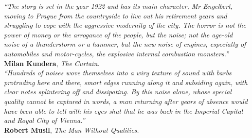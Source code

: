 \documentclass[final,twoside,11pt]{book}
\makeatletter
\numberwithin{equation}{section}
\numberwithin{figure}{chapter}
\numberwithin{table}{chapter}
\def\cleardoublepage{\clearpage\if@twoside \ifodd\c@page\else
  \hbox{}
  \thispagestyle{empty}
  \newpage
  \if@twocolumn\hbox{}\newpage\fi\fi\fi}
\makeatother
\begin{document}
\begin{flushright}
\begin{minipage}[t]{0.75\textwidth}

\linespread{0.97}\selectfont
{\itshape\small``The story is set in the year 1922 and has its main character, Mr Engelbert, moving to Prague from the countryside to live out his retirement years and struggling to cope with the aggressive modernity of the city. The horror is not the power of money or the arrogance of the people, but the noise; not the age-old noise of a thunderstorm or a hammer, but the new noise of engines, especially of automobiles and motor-cycles, the explosive internal combustion monsters.''}\\[-3mm]

{\cabincondensed\small\hfill \textbf{Milan Kundera}, \emph{The Curtain.}}\\[10mm]

\linespread{0.97}\selectfont
{\itshape\small``Hundreds of noises wove themselves into a wiry texture of sound with barbs protruding here and there, smart edges running along it and subsiding again, with clear notes splintering off and dissipating. By this noise alone, whose special quality cannot be captured in words, a man returning after years of absence would have been able to tell with his eyes shut that he was back in the Imperial Capital and Royal City of Vienna.''}\\[-3mm]

{\cabincondensed\small\hfill \textbf{Robert Musil}, \emph{The Man Without Qualities.}}
\end{minipage}
\end{flushright}

\cleardoublepage

\end{document}
